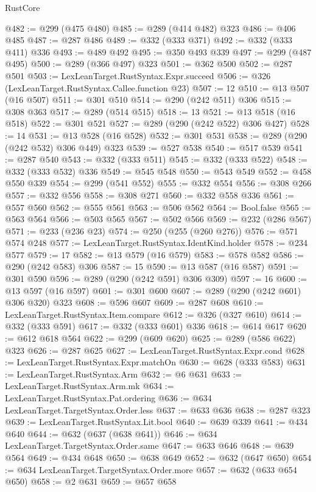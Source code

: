 \begin{lexlean}{RustCore}
\begin{coremodule}
@482 := @299 (@475 @480)
@485 := @289 (@414 @482) @323
@486 := @406 @485
@487 := @287 @486
@489 := @332 (@333 @371)
@492 := @332 (@333 @411) @336
@493 := @489 @492
@495 := @350 @493 @339
@497 := @299 (@487 @495)
@500 := @289 (@366 @497) @323
@501 := @362 @500
@502 := @287 @501
@503 := LexLeanTarget.RustSyntax.Expr.succeed
@506 := @326 (LexLeanTarget.RustSyntax.Callee.function @23)
@507 := 12
@510 := @13 @507 (@16 @507)
@511 := @301 @510
@514 := @290 (@242 @511) @306
@515 := @308 @363
@517 := @289 (@514 @515)
@518 := 13
@521 := @13 @518 (@16 @518)
@522 := @301 @521
@527 := @289 (@290 (@242 @522) @306 @427)
@528 := 14
@531 := @13 @528 (@16 @528)
@532 := @301 @531
@538 := @289 (@290 (@242 @532) @306 @449) @323
@539 := @527 @538
@540 := @517 @539
@541 := @287 @540
@543 := @332 (@333 @511)
@545 := @332 (@333 @522)
@548 := @332 (@333 @532) @336
@549 := @545 @548
@550 := @543 @549
@552 := @458 @550 @339
@554 := @299 (@541 @552)
@555 := @332 @554
@556 := @308 @266
@557 := @332 @556
@558 := @308 @271
@560 := @332 @558 @336
@561 := @557 @560
@562 := @555 @561
@563 := @506 @562
@564 := Bool.false
@565 := @563 @564
@566 := @503 @565
@567 := @502 @566
@569 := @232 (@286 @567)
@571 := @233 (@236 @23)
@574 := @250 (@255 (@260 @276))
@576 := @571 @574 @248
@577 := LexLeanTarget.RustSyntax.IdentKind.holder
@578 := @234 @577
@579 := 17
@582 := @13 @579 (@16 @579)
@583 := @578 @582
@586 := @290 (@242 @583) @306
@587 := 15
@590 := @13 @587 (@16 @587)
@591 := @301 @590
@596 := @289 (@290 (@242 @591) @306 @309)
@597 := 16
@600 := @13 @597 (@16 @597)
@601 := @301 @600
@607 := @289 (@290 (@242 @601) @306 @320) @323
@608 := @596 @607
@609 := @287 @608
@610 := LexLeanTarget.RustSyntax.Item.compare
@612 := @326 (@327 @610)
@614 := @332 (@333 @591)
@617 := @332 (@333 @601) @336
@618 := @614 @617
@620 := @612 @618 @564
@622 := @299 (@609 @620)
@625 := @289 (@586 @622) @323
@626 := @287 @625
@627 := LexLeanTarget.RustSyntax.Expr.cond
@628 := LexLeanTarget.RustSyntax.Expr.matchOn
@630 := @628 (@333 @583)
@631 := LexLeanTarget.RustSyntax.Arm
@632 := @6 @631
@633 := LexLeanTarget.RustSyntax.Arm.mk
@634 := LexLeanTarget.RustSyntax.Pat.ordering
@636 := @634 LexLeanTarget.TargetSyntax.Order.less
@637 := @633 @636
@638 := @287 @323
@639 := LexLeanTarget.RustSyntax.Lit.bool
@640 := @639 @339
@641 := @434 @640
@644 := @632 (@637 (@638 @641))
@646 := @634 LexLeanTarget.TargetSyntax.Order.same
@647 := @633 @646
@648 := @639 @564
@649 := @434 @648
@650 := @638 @649
@652 := @632 (@647 @650)
@654 := @634 LexLeanTarget.TargetSyntax.Order.more
@657 := @632 (@633 @654 @650)
@658 := @2 @631
@659 := @657 @658

\end{coremodule}
\end{lexlean}
